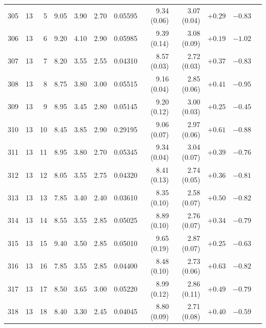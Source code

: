 \begin{longtable}{@{}rrrrrrrrrrrr@{}}
305 & 13 & 5 & \num{9.05} & \num{3.90} & \num{2.70} & \num{0.05595} & \num{9.34} (\num{0.06}) & \num{3.07} (\num{0.04}) & $+\num{0.29}$ & $-\num{0.83}$ &  \\
306 & 13 & 6 & \num{9.20} & \num{4.10} & \num{2.90} & \num{0.05985} & \num{9.39} (\num{0.14}) & \num{3.08} (\num{0.09}) & $+\num{0.19}$ & $-\num{1.02}$ &  \\
307 & 13 & 7 & \num{8.20} & \num{3.55} & \num{2.55} & \num{0.04310} & \num{8.57} (\num{0.03}) & \num{2.72} (\num{0.03}) & $+\num{0.37}$ & $-\num{0.83}$ &  \\
308 & 13 & 8 & \num{8.75} & \num{3.80} & \num{3.00} & \num{0.05515} & \num{9.16} (\num{0.04}) & \num{2.85} (\num{0.06}) & $+\num{0.41}$ & $-\num{0.95}$ &  \\
309 & 13 & 9 & \num{8.95} & \num{3.45} & \num{2.80} & \num{0.05145} & \num{9.20} (\num{0.12}) & \num{3.00} (\num{0.03}) & $+\num{0.25}$ & $-\num{0.45}$ &  \\
310 & 13 & 10 & \num{8.45} & \num{3.85} & \num{2.90} & \num{0.29195} & \num{9.06} (\num{0.07}) & \num{2.97} (\num{0.06}) & $+\num{0.61}$ & $-\num{0.88}$ &  \\
311 & 13 & 11 & \num{8.95} & \num{3.80} & \num{2.70} & \num{0.05345} & \num{9.34} (\num{0.04}) & \num{3.04} (\num{0.07}) & $+\num{0.39}$ & $-\num{0.76}$ &  \\
312 & 13 & 12 & \num{8.05} & \num{3.55} & \num{2.75} & \num{0.04320} & \num{8.41} (\num{0.13}) & \num{2.74} (\num{0.05}) & $+\num{0.36}$ & $-\num{0.81}$ &  \\
313 & 13 & 13 & \num{7.85} & \num{3.40} & \num{2.40} & \num{0.03610} & \num{8.35} (\num{0.10}) & \num{2.58} (\num{0.07}) & $+\num{0.50}$ & $-\num{0.82}$ &  \\
314 & 13 & 14 & \num{8.55} & \num{3.55} & \num{2.85} & \num{0.05025} & \num{8.89} (\num{0.10}) & \num{2.76} (\num{0.07}) & $+\num{0.34}$ & $-\num{0.79}$ &  \\
315 & 13 & 15 & \num{9.40} & \num{3.50} & \num{2.85} & \num{0.05010} & \num{9.65} (\num{0.19}) & \num{2.87} (\num{0.07}) & $+\num{0.25}$ & $-\num{0.63}$ &  \\
316 & 13 & 16 & \num{7.85} & \num{3.55} & \num{2.85} & \num{0.04400} & \num{8.48} (\num{0.10}) & \num{2.73} (\num{0.06}) & $+\num{0.63}$ & $-\num{0.82}$ &  \\
317 & 13 & 17 & \num{8.50} & \num{3.65} & \num{3.00} & \num{0.05220} & \num{8.99} (\num{0.12}) & \num{2.86} (\num{0.11}) & $+\num{0.49}$ & $-\num{0.79}$ &  \\
318 & 13 & 18 & \num{8.40} & \num{3.30} & \num{2.45} & \num{0.04045} & \num{8.80} (\num{0.09}) & \num{2.71} (\num{0.08}) & $+\num{0.40}$ & $-\num{0.59}$ &  \\

\end{longtable}
